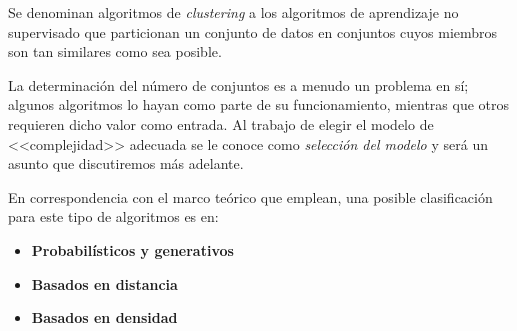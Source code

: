Se denominan algoritmos de \textit{clustering} a los algoritmos de aprendizaje no supervisado que particionan un conjunto de datos en conjuntos cuyos miembros son tan similares como sea posible.

La determinación del número de conjuntos es a menudo un problema en sí;
algunos algoritmos lo hayan como parte de su funcionamiento, mientras que otros requieren dicho valor como entrada.
Al trabajo de elegir el modelo de <<complejidad>> adecuada se le conoce como \textit{selección del modelo} y será un asunto que discutiremos más adelante. %

En correspondencia con el marco teórico que emplean, una posible clasificación para este tipo de algoritmos es en:
\begin{itemize}
    \item \textbf{Probabilísticos y generativos}
    \item \textbf{Basados en distancia}
    \item \textbf{Basados en densidad}
\end{itemize}
